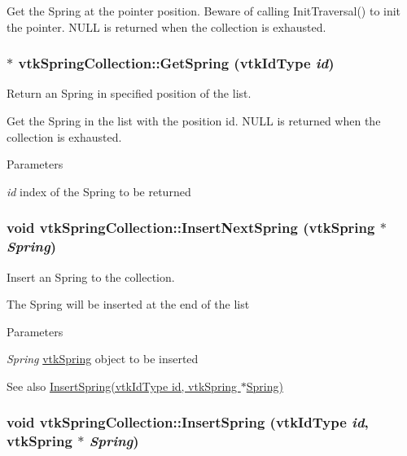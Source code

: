 Get the Spring at the pointer position. Beware of calling InitTraversal() to init the pointer. NULL is returned when the collection is exhausted. \hypertarget{classvtkSpringCollection_a511c3de7caa9127f6c8c580847f80658}{
\subsubsection[{GetSpring}]{ $\ast$ vtkSpringCollection::GetSpring (vtkIdType {\em id})}}
\label{classvtkSpringCollection_a511c3de7caa9127f6c8c580847f80658}


Return an Spring in specified position of the list. 

Get the Spring in the list with the position id. NULL is returned when the collection is exhausted. 
\begin{DoxyParams}{Parameters}
\item[{\em id}]index of the Spring to be returned \end{DoxyParams}
\hypertarget{classvtkSpringCollection_a5f4f41081d180270bff00fddf137a64f}{
\subsubsection[{InsertNextSpring}]{\setlength{\rightskip}{0pt plus 5cm}void vtkSpringCollection::InsertNextSpring ({\bf vtkSpring} $\ast$ {\em Spring})}}
\label{classvtkSpringCollection_a5f4f41081d180270bff00fddf137a64f}


Insert an Spring to the collection. 

The Spring will be inserted at the end of the list 
\begin{DoxyParams}{Parameters}
\item[{\em Spring}]\hyperlink{classvtkSpring}{vtkSpring} object to be inserted \end{DoxyParams}
\begin{DoxySeeAlso}{See also}
\hyperlink{classvtkSpringCollection_a664f87423429e1acde67f37f835ce13c}{InsertSpring(vtkIdType id, vtkSpring $\ast$Spring)} 
\end{DoxySeeAlso}
\hypertarget{classvtkSpringCollection_a664f87423429e1acde67f37f835ce13c}{
\subsubsection[{InsertSpring}]{\setlength{\rightskip}{0pt plus 5cm}void vtkSpringCollection::InsertSpring (vtkIdType {\em id}, \/  {\bf vtkSpring} $\ast$ {\em Spring})}}
\label{classvtkSpringCollection_a664f87423429e1acde67f37f835ce13c}


